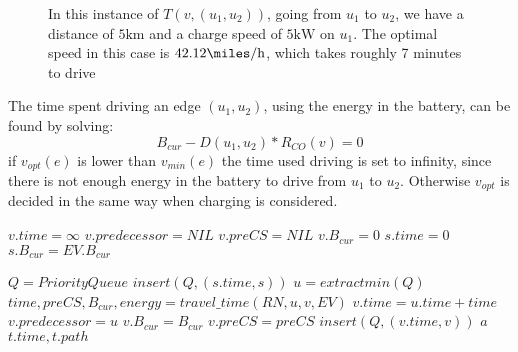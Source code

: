 \begin{figure}[!htb]
\label{fig:graph}
% 
\caption{In this instance of $T(v,(u_1, u_2))$, going from $u_1$ to $u_2$, we have a distance of $5 \si{\km}$ and a charge speed of $5 \si{\kW}$ on $u_1$. The optimal speed in this case is $42.12\si{\miles\per\hour}$, which takes roughly 7 minutes to drive}
\end{figure}

The time spent driving an edge $(u_1, u_2)$, using the energy in the battery, can be found by solving:
\[B_{cur} - D(u_1, u_2) * R_{CO}(v) = 0\] 
if $v_{opt}(e)$ is lower than $v_{min}(e)$ the time used driving is set to infinity, since there is not enough energy in the battery to drive from $u_1$ to $u_2$. Otherwise $v_{opt}$ is decided in the same way when charging is considered.


\begin{algorithmic}
		\State $v.time = \infty$
		\State $v.predecessor = NIL$
		\State $v.preCS = NIL$
		\State $v.B_{cur} = 0$
	\EndFor
	\State $s.time = 0$
	\State $s.B_{cur} = EV.B_{cur}$

	\State $Q = PriorityQueue$
	\State $insert(Q, (s.time, s))$	
		\State $u = extractmin(Q)$
			\State $time,preCS,B_{cur},energy = travel\_time(RN, u, v, EV)$
				\State $v.time = u.time + time$
				\State $v.predecessor = u$
				\State $v.B_{cur} = B_{cur}$
				\State $v.preCS = preCS$
				\State $insert(Q, (v.time, v))$	
			\EndIf
				\State $a$
			\EndIf
		\EndFor
	\EndWhile
	\State \Return $t.time, t.path$
\EndFunction
\end{algorithmic}\label{alg:fastest_path}

